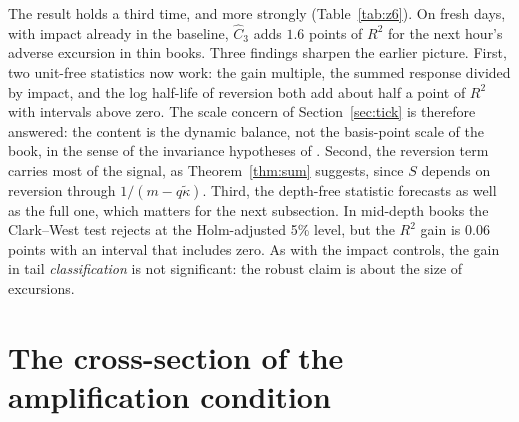 \documentclass[12pt]{article}
\theoremstyle{definition}
\theoremstyle{remark}
\begin{document}
The result holds a third time, and more strongly (Table~\ref{tab:z6}). On fresh days, with impact already in the baseline, $\hat C_3$ adds $1.6$ points of $R^2$ for the next hour's adverse excursion in thin books. Three findings sharpen the earlier picture. First, two unit-free statistics now work: the gain multiple, the summed response divided by impact, and the log half-life of reversion both add about half a point of $R^2$ with intervals above zero. The scale concern of Section~\ref{sec:tick} is therefore answered: the content is the dynamic balance, not the basis-point scale of the book, in the sense of the invariance hypotheses of \citet{kyle2016}. Second, the reversion term carries most of the signal, as Theorem~\ref{thm:sum} suggests, since $S$ depends on reversion through $1/(m-q\tilde\kappa)$. Third, the depth-free statistic forecasts as well as the full one, which matters for the next subsection. In mid-depth books the Clark--West test rejects at the Holm-adjusted 5\% level, but the $R^2$ gain is $0.06$ points with an interval that includes zero. As with the impact controls, the gain in tail \emph{classification} is not significant: the robust claim is about the size of excursions.

\section{The cross-section of the amplification condition}
\end{document}
